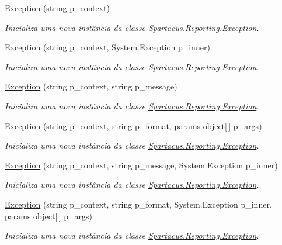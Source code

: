 \begin{DoxyCompactItemize}
\item 
\hyperlink{classSpartacus_1_1Reporting_1_1Exception_a547dfd31ac15f7a1a1dd78aacff47876}{Exception} (string p\+\_\+context)
\begin{DoxyCompactList}\small\item\em Inicializa uma nova instância da classe \hyperlink{classSpartacus_1_1Reporting_1_1Exception}{Spartacus.\+Reporting.\+Exception}. \end{DoxyCompactList}\item 
\hyperlink{classSpartacus_1_1Reporting_1_1Exception_a1733858bc80ceff8fe38e38fc741aa9c}{Exception} (string p\+\_\+context, System.\+Exception p\+\_\+inner)
\begin{DoxyCompactList}\small\item\em Inicializa uma nova instância da classe \hyperlink{classSpartacus_1_1Reporting_1_1Exception}{Spartacus.\+Reporting.\+Exception}. \end{DoxyCompactList}\item 
\hyperlink{classSpartacus_1_1Reporting_1_1Exception_a33f61683704033d886603e692edbc9c9}{Exception} (string p\+\_\+context, string p\+\_\+message)
\begin{DoxyCompactList}\small\item\em Inicializa uma nova instância da classe \hyperlink{classSpartacus_1_1Reporting_1_1Exception}{Spartacus.\+Reporting.\+Exception}. \end{DoxyCompactList}\item 
\hyperlink{classSpartacus_1_1Reporting_1_1Exception_a71d8433cb75a06b96e673ec296fa0d09}{Exception} (string p\+\_\+context, string p\+\_\+format, params object\mbox{[}$\,$\mbox{]} p\+\_\+args)
\begin{DoxyCompactList}\small\item\em Inicializa uma nova instância da classe \hyperlink{classSpartacus_1_1Reporting_1_1Exception}{Spartacus.\+Reporting.\+Exception}. \end{DoxyCompactList}\item 
\hyperlink{classSpartacus_1_1Reporting_1_1Exception_ad67d5db9fcea34b35f069a269eec813c}{Exception} (string p\+\_\+context, string p\+\_\+message, System.\+Exception p\+\_\+inner)
\begin{DoxyCompactList}\small\item\em Inicializa uma nova instância da classe \hyperlink{classSpartacus_1_1Reporting_1_1Exception}{Spartacus.\+Reporting.\+Exception}. \end{DoxyCompactList}\item 
\hyperlink{classSpartacus_1_1Reporting_1_1Exception_a1c822492d0048058f1f5e0b17bf11669}{Exception} (string p\+\_\+context, string p\+\_\+format, System.\+Exception p\+\_\+inner, params object\mbox{[}$\,$\mbox{]} p\+\_\+args)
\begin{DoxyCompactList}\small\item\em Inicializa uma nova instância da classe \hyperlink{classSpartacus_1_1Reporting_1_1Exception}{Spartacus.\+Reporting.\+Exception}. \end{DoxyCompactList}\end{DoxyCompactItemize}

